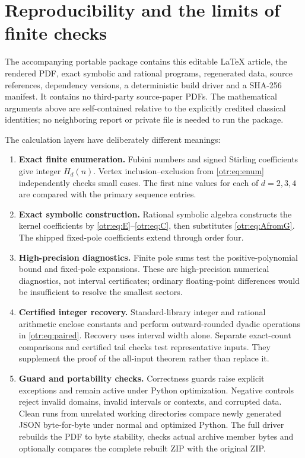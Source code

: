 \documentclass[11pt,a4paper]{article}
\theoremstyle{definition}\newtheorem{definition}[theorem]{Definition}
\theoremstyle{remark}\newtheorem{remark}[theorem]{Remark}
\begin{document}
\section{Reproducibility and the limits of finite checks}
\label{otr:sec:repro}
The accompanying portable package contains this editable \LaTeX{} article, the rendered PDF, exact symbolic and rational programs, regenerated data, source references, dependency versions, a deterministic build driver and a SHA-256 manifest. It contains no third-party source-paper PDFs. The mathematical arguments above are self-contained relative to the explicitly credited classical identities; no neighboring report or private file is needed to run the package.

The calculation layers have deliberately different meanings:
\begin{enumerate}
\item \textbf{Exact finite enumeration.} Fubini numbers and signed Stirling coefficients give integer $H_d(n)$. Vertex inclusion--exclusion from \eqref{otr:eq:enum} independently checks small cases. The first nine values for each of $d=2,3,4$ are compared with the primary sequence entries.
\item \textbf{Exact symbolic construction.} Rational symbolic algebra constructs the kernel coefficients by \eqref{otr:eq:E}--\eqref{otr:eq:C}, then substitutes \eqref{otr:eq:AfromG}. The shipped fixed-pole coefficients extend through order four.
\item \textbf{High-precision diagnostics.} Finite pole sums test the positive-polynomial bound and fixed-pole expansions. These are high-precision numerical diagnostics, not interval certificates; ordinary floating-point differences would be insufficient to resolve the smallest sectors.
\item \textbf{Certified integer recovery.} Standard-library integer and rational arithmetic enclose constants and perform outward-rounded dyadic operations in \eqref{otr:eq:paired}. Recovery uses interval width alone. Separate exact-count comparisons and certified tail checks test representative inputs. They supplement the proof of the all-input theorem rather than replace it.
\item \textbf{Guard and portability checks.} Correctness guards raise explicit exceptions and remain active under Python optimization. Negative controls reject invalid domains, invalid intervals or contexts, and corrupted data. Clean runs from unrelated working directories compare newly generated JSON byte-for-byte under normal and optimized Python. The full driver rebuilds the PDF to byte stability, checks actual archive member bytes and optionally compares the complete rebuilt ZIP with the original ZIP.
\end{enumerate}
\end{document}
